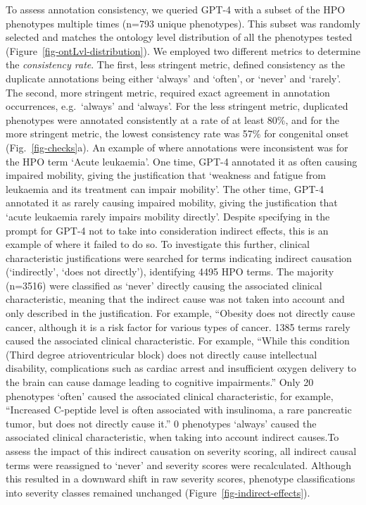 \documentclass[
]{agujournal2019}
\begin{document}
To assess annotation consistency, we queried GPT-4 with a subset of the
HPO phenotypes multiple times (n=793 unique phenotypes). This subset was
randomly selected and matches the ontology level distribution of all the
phenotypes tested (Figure~\ref{fig-ontLvl-distribution}). We employed
two different metrics to determine the \emph{consistency rate}. The
first, less stringent metric, defined consistency as the duplicate
annotations being either `always' and `often', or `never' and `rarely'.
The second, more stringent metric, required exact agreement in
annotation occurrences, e.g.~`always' and `always'. For the less
stringent metric, duplicated phenotypes were annotated consistently at a
rate of at least 80\%, and for the more stringent metric, the lowest
consistency rate was 57\% for congenital onset (Fig.~\ref{fig-checks}a).
An example of where annotations were inconsistent was for the HPO term
`Acute leukaemia'. One time, GPT-4 annotated it as often causing
impaired mobility, giving the justification that `weakness and fatigue
from leukaemia and its treatment can impair mobility'. The other time,
GPT-4 annotated it as rarely causing impaired mobility, giving the
justification that `acute leukaemia rarely impairs mobility directly'.
Despite specifying in the prompt for GPT-4 not to take into
consideration indirect effects, this is an example of where it failed to
do so. To investigate this further, clinical characteristic
justifications were searched for terms indicating indirect causation
(`indirectly', `does not directly'), identifying 4495 HPO terms. The
majority (n=3516) were classified as `never' directly causing the
associated clinical characteristic, meaning that the indirect cause was
not taken into account and only described in the justification. For
example, ``Obesity does not directly cause cancer, although it is a risk
factor for various types of cancer. 1385 terms rarely caused the
associated clinical characteristic. For example, ``While this condition
(Third degree atrioventricular block) does not directly cause
intellectual disability, complications such as cardiac arrest and
insufficient oxygen delivery to the brain can cause damage leading to
cognitive impairments.'' Only 20 phenotypes `often' caused the
associated clinical characteristic, for example, ``Increased C-peptide
level is often associated with insulinoma, a rare pancreatic tumor, but
does not directly cause it.'' 0 phenotypes `always' caused the
associated clinical characteristic, when taking into account indirect
causes.To assess the impact of this indirect causation on severity
scoring, all indirect causal terms were reassigned to `never' and
severity scores were recalculated. Although this resulted in a downward
shift in raw severity scores, phenotype classifications into severity
classes remained unchanged (Figure~\ref{fig-indirect-effects}).
\end{document}

